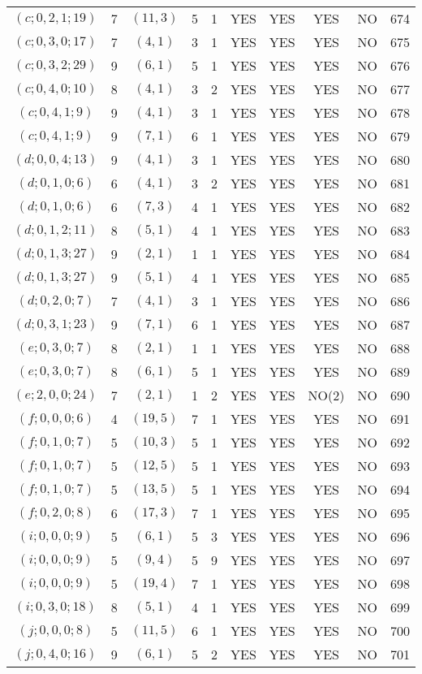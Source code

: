 \begin{longtable}{|c|c|c|c|c|c|c|c|c|c|}
$(c; 0, 2, 1; 19)$ & 7 & $(11, 3)$ & 5 & 1 & YES & YES & YES & NO & 674\\
$(c; 0, 3, 0; 17)$ & 7 & $(4, 1)$ & 3 & 1 & YES & YES & YES & NO & 675\\
$(c; 0, 3, 2; 29)$ & 9 & $(6, 1)$ & 5 & 1 & YES & YES & YES & NO & 676\\
$(c; 0, 4, 0; 10)$ & 8 & $(4, 1)$ & 3 & 2 & YES & YES & YES & NO & 677\\
$(c; 0, 4, 1; 9)$ & 9 & $(4, 1)$ & 3 & 1 & YES & YES & YES & NO & 678\\
$(c; 0, 4, 1; 9)$ & 9 & $(7, 1)$ & 6 & 1 & YES & YES & YES & NO & 679\\
$(d; 0, 0, 4; 13)$ & 9 & $(4, 1)$ & 3 & 1 & YES & YES & YES & NO & 680\\
$(d; 0, 1, 0; 6)$ & 6 & $(4, 1)$ & 3 & 2 & YES & YES & YES & NO & 681\\
$(d; 0, 1, 0; 6)$ & 6 & $(7, 3)$ & 4 & 1 & YES & YES & YES & NO & 682\\
$(d; 0, 1, 2; 11)$ & 8 & $(5, 1)$ & 4 & 1 & YES & YES & YES & NO & 683\\
$(d; 0, 1, 3; 27)$ & 9 & $(2, 1)$ & 1 & 1 & YES & YES & YES & NO & 684\\
$(d; 0, 1, 3; 27)$ & 9 & $(5, 1)$ & 4 & 1 & YES & YES & YES & NO & 685\\
$(d; 0, 2, 0; 7)$ & 7 & $(4, 1)$ & 3 & 1 & YES & YES & YES & NO & 686\\
$(d; 0, 3, 1; 23)$ & 9 & $(7, 1)$ & 6 & 1 & YES & YES & YES & NO & 687\\
$(e; 0, 3, 0; 7)$ & 8 & $(2, 1)$ & 1 & 1 & YES & YES & YES & NO & 688\\
$(e; 0, 3, 0; 7)$ & 8 & $(6, 1)$ & 5 & 1 & YES & YES & YES & NO & 689\\
$(e; 2, 0, 0; 24)$ & 7 & $(2, 1)$ & 1 & 2 & YES & YES & NO(2) & NO & 690\\
$(f; 0, 0, 0; 6)$ & 4 & $(19, 5)$ & 7 & 1 & YES & YES & YES & NO & 691\\
$(f; 0, 1, 0; 7)$ & 5 & $(10, 3)$ & 5 & 1 & YES & YES & YES & NO & 692\\
$(f; 0, 1, 0; 7)$ & 5 & $(12, 5)$ & 5 & 1 & YES & YES & YES & NO & 693\\
$(f; 0, 1, 0; 7)$ & 5 & $(13, 5)$ & 5 & 1 & YES & YES & YES & NO & 694\\
$(f; 0, 2, 0; 8)$ & 6 & $(17, 3)$ & 7 & 1 & YES & YES & YES & NO & 695\\
$(i; 0, 0, 0; 9)$ & 5 & $(6, 1)$ & 5 & 3 & YES & YES & YES & NO & 696\\
$(i; 0, 0, 0; 9)$ & 5 & $(9, 4)$ & 5 & 9 & YES & YES & YES & NO & 697\\
$(i; 0, 0, 0; 9)$ & 5 & $(19, 4)$ & 7 & 1 & YES & YES & YES & NO & 698\\
$(i; 0, 3, 0; 18)$ & 8 & $(5, 1)$ & 4 & 1 & YES & YES & YES & NO & 699\\
$(j; 0, 0, 0; 8)$ & 5 & $(11, 5)$ & 6 & 1 & YES & YES & YES & NO & 700\\
$(j; 0, 4, 0; 16)$ & 9 & $(6, 1)$ & 5 & 2 & YES & YES & YES & NO & 701
\end{longtable}
